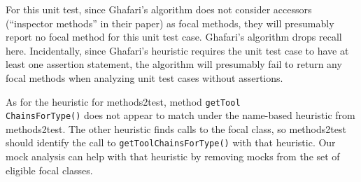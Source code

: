 For this unit test, since Ghafari's algorithm does not consider accessors (``inspector methods'' in their paper) as focal methods, they will presumably report no focal method for this unit test case. Ghafari's algorithm drops recall here.
Incidentally, since Ghafari's heuristic requires the unit test case to have at least one assertion statement, the algorithm will presumably fail to return any focal methods when analyzing unit test cases without assertions.

As for the heuristic for methods2test, method \texttt{getTool\\ChainsForType()} does not appear to match under the name-based heuristic from methods2test. The other heuristic finds calls to the focal class, so methods2test should identify the call to \texttt{getToolChainsForType()} with that heuristic. Our mock analysis can help with that heuristic by removing mocks from the set of eligible focal classes.

\begin{table*}
	\centering
	\caption{Comparison of \% of test cases with reported focal methods by the two automated focal method detection algorithms.}
	\vspace*{.5em}
	\label{tab:focal-method-algorithm-comparison}
\end{table*}


